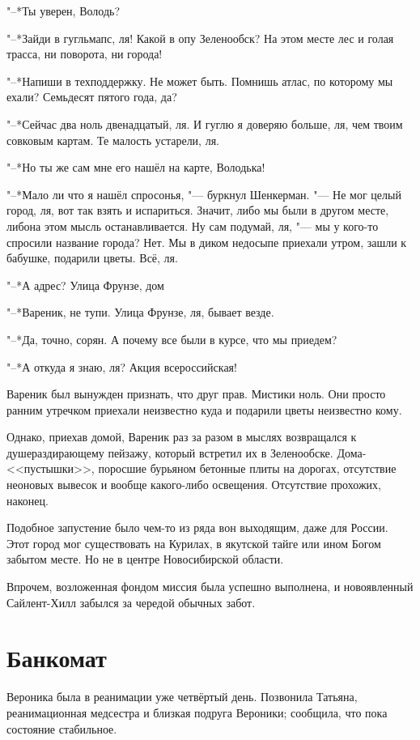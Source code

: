 "--*Ты уверен, Володь?

"--*Зайди в гугльмапс, ля!
Какой в опу Зеленообск?
На этом месте лес и голая трасса, ни поворота, ни города!

"--*Напиши в техподдержку.
Не может быть.
Помнишь атлас, по которому мы ехали?
Семьдесят пятого года, да?

"--*Сейчас два ноль двенадцатый, ля.
И гуглю я доверяю больше, ля, чем твоим совковым картам.
Те малость устарели, ля.

"--*Но ты же сам мне его нашёл на карте, Володька!

"--*Мало ли что я нашёл спросонья, "--- буркнул Шенкерман.
"--- Не мог целый город, ля, вот так взять и испариться.
Значит, либо мы были в другом месте, либо\ldotst на этом мысль останавливается.
Ну сам подумай, ля, "--- мы у кого-то спросили название города?
Нет.
Мы в диком недосыпе приехали утром, зашли к бабушке, подарили цветы.
Всё, ля.

"--*А адрес?
Улица Фрунзе, дом\ldotst

"--*Вареник, не тупи.
Улица Фрунзе, ля, бывает везде.

"--*Да, точно, сорян.
А почему все были в курсе, что мы приедем?

"--*А откуда я знаю, ля?
Акция всероссийская!

Вареник был вынужден признать, что друг прав.
Мистики ноль.
Они просто ранним утречком приехали неизвестно куда и подарили цветы неизвестно кому.

Однако, приехав домой, Вареник раз за разом в мыслях возвращался к душераздирающему пейзажу, который встретил их в Зеленообске.
Дома-<<пустышки>>, поросшие бурьяном бетонные плиты на дорогах, отсутствие неоновых вывесок и вообще какого-либо освещения.
Отсутствие прохожих, наконец.

Подобное запустение было чем-то из ряда вон выходящим, даже для России.
Этот город мог существовать на Курилах, в якутской тайге или ином Богом забытом месте.
Но не в центре Новосибирской области.

Впрочем, возложенная фондом миссия была успешно выполнена, и новоявленный Сайлент-Хилл забылся за чередой обычных забот.

\section{Банкомат}

Вероника была в реанимации уже четвёртый день.
Позвонила Татьяна, реанимационная медсестра и близкая подруга Вероники;
сообщила, что пока состояние стабильное.

